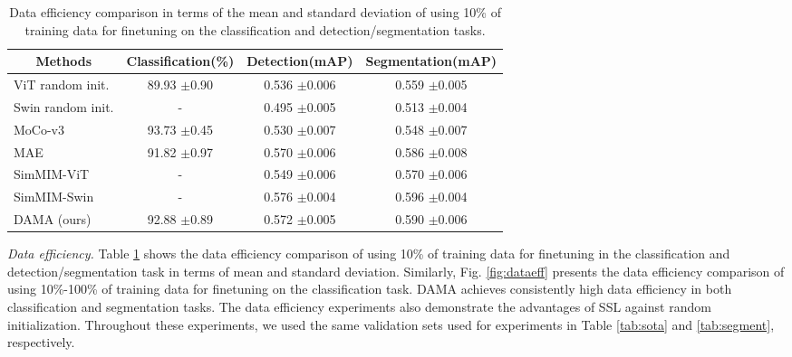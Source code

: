 \documentclass[10pt,twocolumn,letterpaper]{article}
\begin{document}
\begin{table}[] \centering
\footnotesize
\begin{tabular}{l@{\hskip0.2cm}c@{\hskip 0.3cm}c@{\hskip 0.3cm}c@{\hskip 0.3cm}}
\hline
\multicolumn{1}{c}{\scriptsize Methods}         & \scriptsize Classification(\%)        & \scriptsize Detection(mAP)                        & \scriptsize Segmentation(mAP)\\
\hline
ViT random init.  & 89.93 $\pm$0.90 & 0.536 $\pm$0.006 & 0.559 $\pm$0.005 \\
Swin random init. & - & 0.495 $\pm$0.005                    & 0.513 $\pm$0.004 \\
MoCo-v3 \cite{mocov3} & 93.73 $\pm$0.45               & 0.530 $\pm$0.007                    & 0.548  $\pm$0.007 \\
MAE  \cite{mae} & 91.82 $\pm$0.97                  & 0.570 $\pm$0.006                     & 0.586  $\pm$0.008 \\
SimMIM-ViT \cite{simmim} & -             & 0.549 $\pm$0.006                     & 0.570  $\pm$0.006 \\
SimMIM-Swin \cite{simmim} & -           & 0.576 $\pm$0.004                    & 0.596  $\pm$0.004 \\
DAMA (ours)  & 92.88 $\pm$0.89                 & 0.572 $\pm$0.005                      & 0.590 $\pm$0.006 \\
\hline
\end{tabular}
\caption{Data efficiency comparison in terms of the mean and standard deviation of using 10\% of training data for finetuning on the classification and detection/segmentation tasks. }
\label{tab:effclsseg}
\vspace{-10pt}
\end{table}


\textcolor{nblue}{\textit{Data efficiency.}} Table \ref{tab:effclsseg} shows the data efficiency comparison of using 10\% of training data for
finetuning in the classification and detection/segmentation task in terms of mean and standard deviation. Similarly, Fig. \ref{fig:dataeff} presents the data efficiency comparison of using 10\%-100\% of training data for finetuning on the classification task. DAMA achieves consistently high data efficiency in both classification and segmentation tasks. The data efficiency experiments also demonstrate the advantages of SSL against random initialization. Throughout these experiments, we used the same validation sets used for experiments in Table \ref{tab:sota} and \ref{tab:segment}, respectively.
\end{document}
